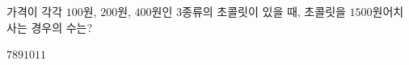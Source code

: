 \hspace*{2mm}\begin{minipage}[t]{\dimexpr\linewidth-2mm\relax}\vspace{0pt}
가격이 각각 $100$원, $200$원, $400$원인 $3$종류의 초콜릿이 있을 때, 초콜릿을 $1500$원어치 사는 경우의 수는? 
\begin{choices32}{$7$}{$8$}{$9$}{$10$}{$11$}\end{choices32}\end{minipage}
